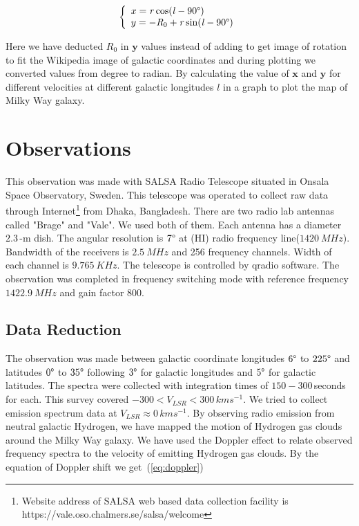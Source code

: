 \documentclass[10pt,conference]{IEEEtran}
\begin{document}
\begin{equation}
\left\lbrace
\begin{array}{l}
	x=\mathit{r} \cos (\mathit{l}-90\degree) \\
	y=-\mathit{R}_{0}+\mathit{r} \sin (\mathit{l}-90\degree) \\
\end{array}
\right.
\label{eqn:rpmtocart}
\end{equation}

Here we have deducted $\mathit{R}_{0}$ in $\mathbf{y}$ values instead of adding to get image of rotation to fit the Wikipedia image of galactic coordinates and during plotting we converted values from degree to radian. By calculating the value of $\mathbf{x}$ and $\mathbf{y}$ for different velocities at different galactic longitudes $\mathit{l}$ in a graph to plot the map of Milky Way galaxy\cite{CathyHorellou2015,griffiths2016introduction}.

\section{Observations}

This observation was made with SALSA Radio Telescope situated in Onsala Space Observatory, Sweden. This telescope was operated to collect raw data through Internet\footnote{Website address of SALSA web based data collection facility is https://vale.oso.chalmers.se/salsa/welcome} from Dhaka, Bangladesh. There are two radio lab antennas called "Brage" and "Vale". We used both of them. Each antenna has a diameter $2.3$\,-m dish. The angular resolution is $7\degree$ at (HI) radio frequency line($\SI{1420}{MHz}$). Bandwidth of the receivers is $\SI{2.5}{MHz}$ and 256 frequency channels. Width of each channel is $\SI{9.765}{KHz}$. The telescope is controlled by qradio software. The observation was completed in frequency switching mode with reference frequency $\SI{1422.9}{MHz}$ and gain factor $800$\cite{CathyHorellou2015}.

\subsection{Data Reduction}

The observation was made between galactic coordinate longitudes $6\degree$ to $225\degree$ and latitudes $0\degree$ to $35\degree$ following $3\degree$ for galactic longitudes and $5\degree$ for galactic latitudes. The spectra were collected with integration times of $150-300$\,seconds for each. This survey covered $-300<\mathit{V}_{LSR}<300$\,$kms^{-1}$. We tried to collect emission spectrum data at $\mathit{V}_{LSR}\approx 0$\,$kms^{-1}$. By observing radio emission from neutral galactic Hydrogen, we have mapped the motion of Hydrogen gas clouds around the Milky Way galaxy. We have used the Doppler effect to relate observed frequency spectra to the velocity of emitting Hydrogen gas clouds. By the equation of Doppler shift\cite{CathyHorellou2015} we get~(\ref{eq:doppler})
\end{document}
